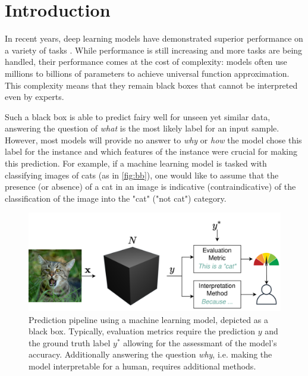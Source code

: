 \section{Introduction}
\label{sec:introduction}

In recent years, deep learning models have demonstrated superior performance on a variety of tasks \cite{ruede2020multi, brinker2019deep, nguyen2020super}. While performance is still increasing and more tasks are being handled, their performance comes at the cost of complexity: models often use millions to billions of parameters to achieve universal function approximation.
This complexity means that they remain black boxes that cannot be interpreted even by experts.


Such a black box is able to predict fairy well for unseen yet similar data, answering the question of \textit{what} is the most likely label for an input sample. However, most models will provide no answer to \textit{why} or \textit{how} the model chose this label for the instance and which features of the instance were crucial for making this prediction. For example, if a machine learning model is tasked with classifying images of cats (as in \autoref{fig:bb}), one would like to assume that the presence (or absence) of a cat in an image is indicative (contraindicative) of the classification of the image into the "cat" ("not cat") category.

\begin{figure}[t]
    \centering
    \includegraphics[width=\linewidth]{figures/bb_cat.png}
    \caption{Prediction pipeline using a machine learning model, depicted as a black box. Typically, evaluation metrics require the prediction $y$ and the ground truth label $y^*$ allowing for the assessmant of the model's accuracy. Additionally answering the question \textit{why}, i.e. making the model interpretable for a human, requires additional methods.}
    \label{fig:bb}
    \vspace{-0.3cm}
\end{figure}


